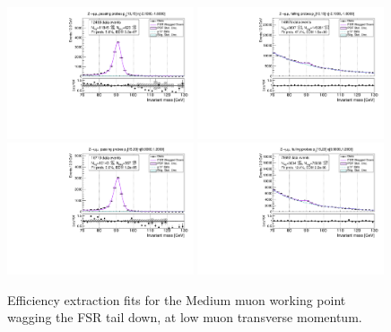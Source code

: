 \begin{figure}
\centering
\includegraphics[width=0.49\textwidth]{figures/Zmm_WagFsrDown_BkgLPi_pass_ptBin0_etaBin1.pdf}
\includegraphics[width=0.49\textwidth]{figures/Zmm_WagFsrDown_BkgLPi_fail_ptBin0_etaBin1.pdf}
\includegraphics[width=0.49\textwidth]{figures/Zmm_WagFsrDown_BkgLPi_pass_ptBin1_etaBin9.pdf}
\includegraphics[width=0.49\textwidth]{figures/Zmm_WagFsrDown_BkgLPi_fail_ptBin1_etaBin9.pdf}
\caption{Efficiency extraction fits for the Medium muon working point wagging the FSR tail down, at low muon transverse momentum.}
\label{fig:ZmmAltSigFSRFits3}
\end{figure}
